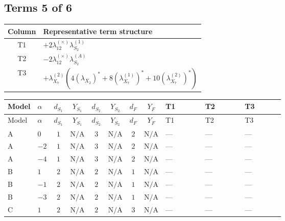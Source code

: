\documentclass[8pt]{article}
\begin{document}
\begin{landscape}
\subsection*{Terms 5 of 6}
\begin{center}
\begin{tabular}{@{}c >{\raggedright\arraybackslash}p{0.82\linewidth}@{}}
\toprule
Column & Representative term structure \\
\midrule
T1 & \(\displaystyle +2 {\lambda_{12}^{(\times)}} {\lambda_{S_2}^{(1)}}\) \\
\midrule
T2 & \(\displaystyle -2 {\lambda_{12}^{(\times)}} {\lambda_{S_2}^{(A)}}\) \\
\midrule
T3 & \(\displaystyle +{\lambda_{X_{7}}^{(2)}} (4 \left({\lambda_{X_{2}}}\right)^{*}+8 \left({\lambda_{X_{7}}^{(1)}}\right)^{*}+10 \left({\lambda_{X_{7}}^{(2)}}\right)^{*})\) \\
\midrule
\bottomrule
\end{tabular}
\end{center}
\smallskip
\tiny
\begin{longtable}{@{}llcccccc >{\raggedright\arraybackslash}p{0.21\linewidth} >{\raggedright\arraybackslash}p{0.21\linewidth} >{\raggedright\arraybackslash}p{0.21\linewidth}@{}}
\toprule
Model & $\alpha$ & $d_{S_1}$ & $Y_{S_1}$ & $d_{S_2}$ & $Y_{S_2}$ & $d_F$ & $Y_F$ & T1 & T2 & T3 \\
\midrule
\endfirsthead
\toprule
Model & $\alpha$ & $d_{S_1}$ & $Y_{S_1}$ & $d_{S_2}$ & $Y_{S_2}$ & $d_F$ & $Y_F$ & T1 & T2 & T3 \\
\midrule
\endhead
A & $0$ & $1$ & $\text{N/A}$ & $3$ & $\text{N/A}$ & $2$ & $\text{N/A}$ & --- & --- & --- \\
\midrule
A & $-2$ & $1$ & $\text{N/A}$ & $3$ & $\text{N/A}$ & $2$ & $\text{N/A}$ & --- & --- & --- \\
\midrule
A & $-4$ & $1$ & $\text{N/A}$ & $3$ & $\text{N/A}$ & $2$ & $\text{N/A}$ & --- & --- & --- \\
\midrule
B & $1$ & $2$ & $\text{N/A}$ & $2$ & $\text{N/A}$ & $1$ & $\text{N/A}$ & --- & --- & --- \\
\midrule
B & $-1$ & $2$ & $\text{N/A}$ & $2$ & $\text{N/A}$ & $1$ & $\text{N/A}$ & --- & --- & --- \\
\midrule
B & $-3$ & $2$ & $\text{N/A}$ & $2$ & $\text{N/A}$ & $1$ & $\text{N/A}$ & --- & --- & --- \\
\midrule
C & $1$ & $2$ & $\text{N/A}$ & $2$ & $\text{N/A}$ & $3$ & $\text{N/A}$ & --- & --- & --- \\

\end{longtable}
\end{landscape}
\end{document}
